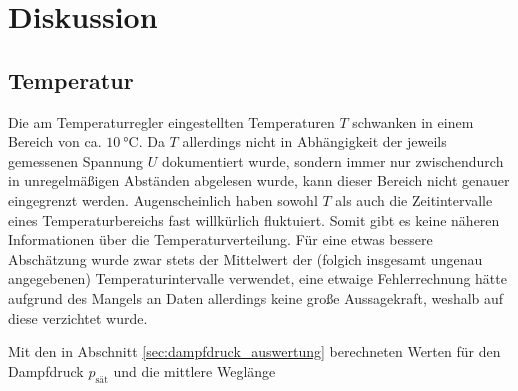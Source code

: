 \section{Diskussion}
\subsection{Temperatur}
Die am Temperaturregler eingestellten Temperaturen $T$ schwanken in einem Bereich von ca. $\qty[]{10}{\celsius}$.
Da $T$ allerdings nicht in Abhängigkeit der jeweils gemessenen Spannung $U$ dokumentiert wurde, 
sondern immer nur zwischendurch in unregelmäßigen Abständen abgelesen wurde, kann dieser Bereich nicht genauer eingegrenzt werden.
Augenscheinlich haben sowohl $T$ als auch die Zeitintervalle eines Temperaturbereichs fast willkürlich fluktuiert.
Somit gibt es keine näheren Informationen über die Temperaturverteilung.
Für eine etwas bessere Abschätzung wurde zwar stets der Mittelwert der (folgich insgesamt ungenau angegebenen) Temperaturintervalle verwendet,
eine etwaige Fehlerrechnung hätte aufgrund des Mangels an Daten allerdings keine große Aussagekraft, weshalb auf diese verzichtet wurde.

\noindent
Mit den in Abschnitt \ref{sec:dampfdruck_auswertung} berechneten Werten für den Dampfdruck $p_\text{sät}$ und die mittlere Weglänge 
